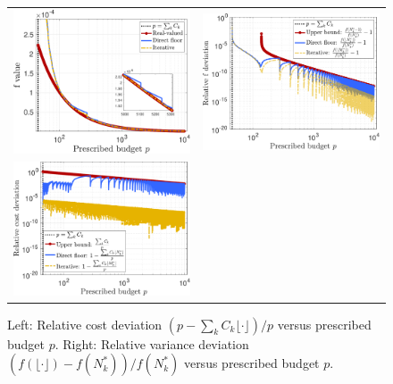 %
\begin{figure}[!t]\centering
\begin{tabular}{cc}
\includegraphics[width=0.48\linewidth]{./Figures/Eg2_f_p.pdf}&
\includegraphics[width=0.48\linewidth]{./Figures/Eg2_f.pdf}\\
\includegraphics[width=0.48\linewidth]{./Figures/Eg2_Cost.pdf}
\end{tabular}
\caption{
Left: Relative cost deviation $(p - \sum_k C_k \lfloor \cdot \rfloor)/p$ versus prescribed budget $p$. Right: Relative variance deviation $(f(\lfloor \cdot \rfloor) - f(N_k^*))/f(N_k^*)$ versus prescribed budget $p$.
} 
\label{fig:Eg2} 
\end{figure}
%












